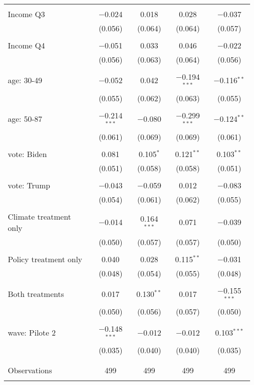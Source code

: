 \begin{tabular}{@{\extracolsep{5pt}}lcccc}
  & & & & \\ 
 Income Q3 & $-$0.024 & 0.018 & 0.028 & $-$0.037 \\ 
  & (0.056) & (0.064) & (0.064) & (0.057) \\ 
  & & & & \\ 
 Income Q4 & $-$0.051 & 0.033 & 0.046 & $-$0.022 \\ 
  & (0.056) & (0.063) & (0.064) & (0.056) \\ 
  & & & & \\ 
 age: 30-49 & $-$0.052 & 0.042 & $-$0.194$^{***}$ & $-$0.116$^{**}$ \\ 
  & (0.055) & (0.062) & (0.063) & (0.055) \\ 
  & & & & \\ 
 age: 50-87 & $-$0.214$^{***}$ & $-$0.080 & $-$0.299$^{***}$ & $-$0.124$^{**}$ \\ 
  & (0.061) & (0.069) & (0.069) & (0.061) \\ 
  & & & & \\ 
 vote: Biden & 0.081 & 0.105$^{*}$ & 0.121$^{**}$ & 0.103$^{**}$ \\ 
  & (0.051) & (0.058) & (0.058) & (0.051) \\ 
  & & & & \\ 
 vote: Trump & $-$0.043 & $-$0.059 & 0.012 & $-$0.083 \\ 
  & (0.054) & (0.061) & (0.062) & (0.055) \\ 
  & & & & \\ 
 Climate treatment only & $-$0.014 & 0.164$^{***}$ & 0.071 & $-$0.039 \\ 
  & (0.050) & (0.057) & (0.057) & (0.050) \\ 
  & & & & \\ 
 Policy treatment only & 0.040 & 0.028 & 0.115$^{**}$ & $-$0.031 \\ 
  & (0.048) & (0.054) & (0.055) & (0.048) \\ 
  & & & & \\ 
 Both treatments & 0.017 & 0.130$^{**}$ & 0.017 & $-$0.155$^{***}$ \\ 
  & (0.050) & (0.056) & (0.057) & (0.050) \\ 
  & & & & \\ 
 wave: Pilote 2 & $-$0.148$^{***}$ & $-$0.012 & $-$0.012 & 0.103$^{***}$ \\ 
  & (0.035) & (0.040) & (0.040) & (0.035) \\ 
  & & & & \\ 
\hline \\[-1.8ex] 

Observations & 499 & 499 & 499 & 499 \\ 
\hline 
\hline \\[-1.8ex] 
\end{tabular} 